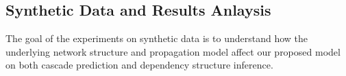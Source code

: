 % 
% 

\subsection{Synthetic Data and Results Anlaysis}
The goal of the experiments on synthetic
data is to understand how the underlying network structure and propagation
model affect our proposed model on both cascade prediction and
dependency structure inference. 

